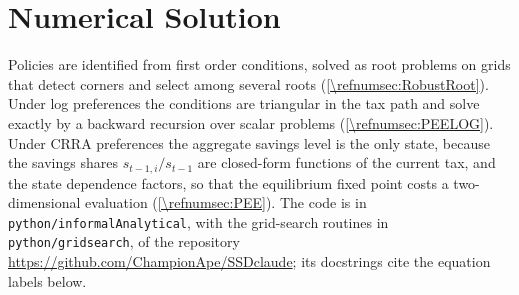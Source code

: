 \edef\refsec{\refnumsec}
\edef\refeq{\refnumeq}
\edef\refalg{\refnumalg}


\section{Numerical Solution}\label{\refsec}
Policies are identified from first order conditions, solved as root problems on grids that detect corners and select among several roots (\cref{\refsec:RobustRoot}). Under log preferences the conditions are triangular in the tax path and solve exactly by a backward recursion over scalar problems (\cref{\refsec:PEELOG}). Under CRRA preferences the aggregate savings level is the only state, because the savings shares $s_{t-1,i}/s_{t-1}$ are closed-form functions of the current tax, and the state dependence factors, so that the equilibrium fixed point costs a two-dimensional evaluation (\cref{\refsec:PEE}). The code is in \texttt{python/informalAnalytical}, with the grid-search routines in \texttt{python/gridsearch}, of the repository \url{https://github.com/ChampionApe/SSDclaude}; its docstrings cite the equation labels below.

